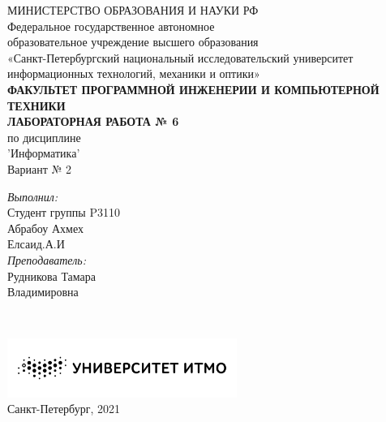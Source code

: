 {\centering
МИНИСТЕРСТВО ОБРАЗОВАНИЯ И НАУКИ РФ \\
\vspace{0.6cm}
Федеральное государственное автономное \\
образовательное учреждение высшего образования \\
«Санкт-Петербургский национальный исследовательский университет \\
 информационных технологий, механики и оптики» \\
\vspace{0.6cm}
\footnotesize{\textbf{ФАКУЛЬТЕТ ПРОГРАММНОЙ ИНЖЕНЕРИИ И КОМПЬЮТЕРНОЙ ТЕХНИКИ}} \\
\vspace{3.2cm}
\Large{\textbf{ЛАБОРАТОРНАЯ РАБОТА № 6}} \\
\large{по дисциплине} \\
\Large{'Информатика'} \\
\vspace{1cm}
\Large{Вариант № 2} \\
\vspace{9cm}
\begin{minipage}{\linewidth}
\raggedleft
\normalsize
\textsl{Выполнил:} \\
Студент группы P3110 \\
Абрабоу Ахмех \\Елсаид.А.И \\
\textsl{Преподаватель:} \\
Рудникова Тамара \\ Владимировна
\end{minipage} \\
\vspace{2cm}
\begin{minipage}{\linewidth}
\centering
\includegraphics[width=7.5cm]{images/logo.png} \\
\normalsize{Санкт-Петербург, 2021} \\
\end{minipage} \\}